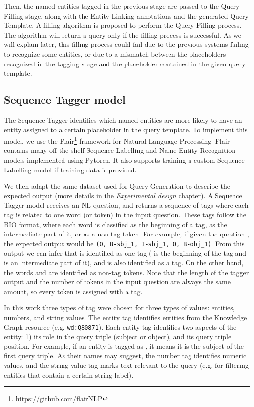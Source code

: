 Then, the named entities tagged in the previous stage are passed to the Query Filling stage, 
along with the Entity Linking annotations and the generated Query Template. A filling 
algorithm is proposed to perform the Query Filling process. The algorithm will return a 
\SPARQL{} query only if the filling process is successful. As we will explain later, this filling 
process could fail due to the previous systems failing to recognize some entities, or due to 
a mismatch between the placeholders recognized in the tagging stage and the placeholder 
contained in the given query template.

\subsection{Sequence Tagger model}
\label{cap3:system/slotFillModule/seqTagger}
The Sequence Tagger identifies which named entities are more likely to have an entity 
assigned to a certain placeholder in the query template. To implement this model, we use the 
Flair\footnote{\url{https://github.com/flairNLP}} framework for Natural Language Processing. Flair 
contains many off-the-shelf Sequence Labelling and Name Entity Recognition models implemented 
using Pytorch. It also supports  training a custom Sequence Labelling model if training data 
is provided.

We then adapt the same dataset used for Query Generation to describe the expected output (more 
details in the \textit{Experimental design} chapter). A Sequence Tagger model receives an NL 
question, and returns a sequence of tags where each tag is related to one word (or token) in 
the input question. These tags follow the BIO format, where each word is classified as the 
beginning of a tag, as the intermediate part of it, or as a non-tag token. For example, if 
given the question , the expected output would be 
\texttt{(O, B-sbj\_1, I-sbj\_1, O, B-obj\_1)}. From this output we can infer that 
 is identified as one tag ( is the beginning of 
the tag and  is an intermediate part of it), and  is also 
identified as a tag. On the other hand, the words  and  are identified 
as non-tag tokens. Note that the length of the tagger output and the number of tokens in the 
input question are always the same amount, so every token is assigned with a tag.

In this work three types of tag were chosen for three types of values: entities, numbers, and 
string values. The entity tag identifies entities from the Knowledge Graph resource (e.g. 
\texttt{wd:Q80871}). Each entity tag identifies two aspects of the entity: 1) its role in the 
query triple (subject or object), and its query triple position. For example, if an entity is 
tagged as , it means it is the subject of the first query triple. As their 
names may suggest, the number tag identifies numeric values, and the string value tag marks 
text relevant to the query (e.g. for filtering entities that contain a certain string label).

